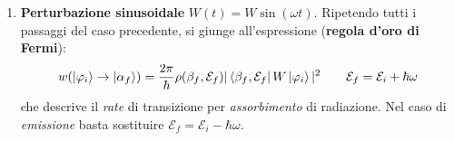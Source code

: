 \documentclass[../../InformazioneQuantistica.tex]{subfiles}
\begin{document}
\begin{enumerate}
    \item \textbf{Perturbazione sinusoidale} $W(t) = W\sin(\omega t)$. Ripetendo tutti i passaggi del caso precedente, si giunge all'espressione (\textbf{regola d'oro di Fermi}):
    \begin{align*}
        w(\Ket{\varphi_i}\to \Ket{\alpha_f}) = \frac{2\pi}{\hbar} \rho(\beta_f,\mathcal{E}_f) |\Bra{\beta_f, \mathcal{E}_f}W\Ket{\varphi_i}|^2 \qquad \mathcal{E}_f = \mathcal{E}_i + \hbar \omega 
    \end{align*}
    che descrive il \textit{rate} di transizione per \textit{assorbimento} di radiazione. Nel caso di \textit{emissione} basta sostituire $\mathcal{E}_f = \mathcal{E}_i - \hbar \omega$.
\end{enumerate}

\end{document}
